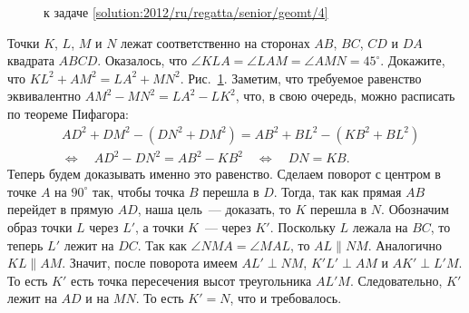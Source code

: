 \ifsolution
\begin{figure}\centering
    \caption{к задаче \ref{solution:2012/ru/regatta/senior/geomt/4}}
    \label{fig:solution:2012/ru/regatta/senior/geomt/4}
\end{figure}
\fi %

\problem
Точки $K$, $L$, $M$ и $N$ лежат соответственно на сторонах
$AB$, $BC$, $CD$ и $DA$ квадрата $ABCD$.
Оказалось, что $\angle KLA = \angle LAM = \angle AMN = 45^\circ$.
Докажите, что $KL^2 + AM^2 = LA^2 + MN^2$.
\solution
\label{solution:2012/ru/regatta/senior/geomt/4}%
Рис.~\ref{fig:solution:2012/ru/regatta/senior/geomt/4}.
Заметим, что требуемое равенство эквивалентно
$AM^2 - MN^2 = LA^2 - LK^2$,
что, в свою очередь, можно расписать по теореме Пифагора:
\begin{align*}
&
    AD^2 + DM^2 - (DN^2 + DM^2) = AB^2 + BL^2 - (KB^2 + BL^2)
\\&\Leftrightarrow\quad
    AD^2 - DN^2 = AB^2 - KB^2
\quad\Leftrightarrow\quad
    DN = KB
.\end{align*}
Теперь будем доказывать именно это равенство.
Сделаем поворот с центром в точке $A$ на $90^\circ$ так, чтобы точка $B$
перешла в $D$.
Тогда, так как прямая $AB$ перейдет в прямую $AD$, наша цель~--- доказать, то
$K$ перешла в $N$.
Обозначим образ точки $L$ через $L'$, а точки $K$~--- через $K'$.
Поскольку $L$ лежала на $BC$, то теперь $L'$ лежит на $DC$.
Так как $\angle NMA = \angle MAL$, то $AL \parallel NM$.
Аналогично $KL \parallel AM$.
Значит, после поворота имеем
$AL' \perp NM$, $K'L' \perp AM$ и $AK' \perp L'M$.
То есть $K'$ есть точка пересечения высот треугольника $AL'M$.
Следовательно, $K'$ лежит на $AD$ и на $MN$.
То есть $K' = N$, что и требовалось.
\endproblem
